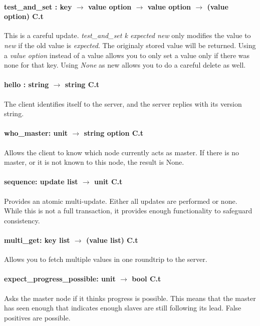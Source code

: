 \paragraph{test\_and\_set : key $\rightarrow$ value option $\rightarrow$ value option $\rightarrow$ (value option) C.t} This is a careful update.
\emph{test\_and\_set k expected new} only modifies the value to \emph{new} if the old value is \emph{expected}.
The originaly stored value will be returned.
Using a \emph{value option} instead of a value allows you to only set a value only if there was none for that key.
Using \emph{None} as new allows you to do a careful delete as well.
\paragraph{hello : string $\rightarrow$ string C.t}
The client identifies itself to the server, and the server replies with its version string.
\paragraph{who\_master: unit $\rightarrow$ string option C.t}
Allows the client to know which node currently acts as master.
If there is no master, or it is not known to this node, the result is None.
%

\paragraph{sequence: update list $\rightarrow$ unit C.t}
Provides an atomic multi-update. Either all updates are performed or none. 
While this is not a full transaction, it provides enough functionality to safeguard consistency.

\paragraph{multi\_get: key list $\rightarrow$ (value list) C.t}
Allows you to fetch multiple values in one roundtrip to the server.

\paragraph{expect\_progress\_possible: unit $\rightarrow$ bool C.t}
Asks the master node if it thinks progress is possible. 
This means that the master has seen enough that indicates enough slaves are still following its lead. 
False positives are possible.
